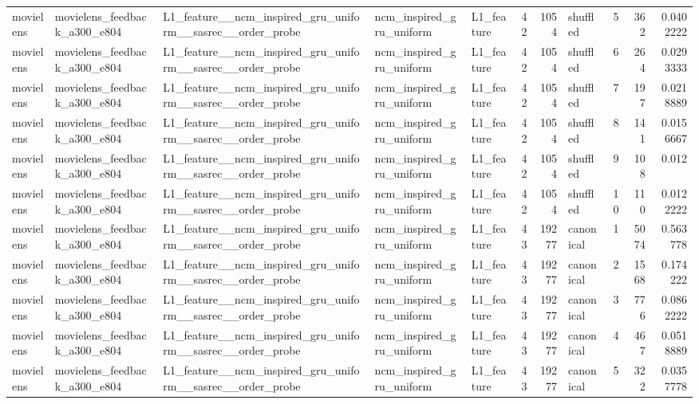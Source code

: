 \begin{table}[htbp!]
\begin{tabular}{lllllrrlrrr}
movielens & movielens\_feedback\_a300\_e804 & L1\_feature\_\_ncm\_inspired\_gru\_uniform\_\_sasrec\_\_order\_probe & ncm\_inspired\_gru\_uniform & L1\_feature & 42 & 1054 & shuffled & 5 & 362 & 0.0402222 \\
movielens & movielens\_feedback\_a300\_e804 & L1\_feature\_\_ncm\_inspired\_gru\_uniform\_\_sasrec\_\_order\_probe & ncm\_inspired\_gru\_uniform & L1\_feature & 42 & 1054 & shuffled & 6 & 264 & 0.0293333 \\
movielens & movielens\_feedback\_a300\_e804 & L1\_feature\_\_ncm\_inspired\_gru\_uniform\_\_sasrec\_\_order\_probe & ncm\_inspired\_gru\_uniform & L1\_feature & 42 & 1054 & shuffled & 7 & 197 & 0.0218889 \\
movielens & movielens\_feedback\_a300\_e804 & L1\_feature\_\_ncm\_inspired\_gru\_uniform\_\_sasrec\_\_order\_probe & ncm\_inspired\_gru\_uniform & L1\_feature & 42 & 1054 & shuffled & 8 & 141 & 0.0156667 \\
movielens & movielens\_feedback\_a300\_e804 & L1\_feature\_\_ncm\_inspired\_gru\_uniform\_\_sasrec\_\_order\_probe & ncm\_inspired\_gru\_uniform & L1\_feature & 42 & 1054 & shuffled & 9 & 108 & 0.012 \\
movielens & movielens\_feedback\_a300\_e804 & L1\_feature\_\_ncm\_inspired\_gru\_uniform\_\_sasrec\_\_order\_probe & ncm\_inspired\_gru\_uniform & L1\_feature & 42 & 1054 & shuffled & 10 & 110 & 0.0122222 \\
movielens & movielens\_feedback\_a300\_e804 & L1\_feature\_\_ncm\_inspired\_gru\_uniform\_\_sasrec\_\_order\_probe & ncm\_inspired\_gru\_uniform & L1\_feature & 43 & 19277 & canonical & 1 & 5074 & 0.563778 \\
movielens & movielens\_feedback\_a300\_e804 & L1\_feature\_\_ncm\_inspired\_gru\_uniform\_\_sasrec\_\_order\_probe & ncm\_inspired\_gru\_uniform & L1\_feature & 43 & 19277 & canonical & 2 & 1568 & 0.174222 \\
movielens & movielens\_feedback\_a300\_e804 & L1\_feature\_\_ncm\_inspired\_gru\_uniform\_\_sasrec\_\_order\_probe & ncm\_inspired\_gru\_uniform & L1\_feature & 43 & 19277 & canonical & 3 & 776 & 0.0862222 \\
movielens & movielens\_feedback\_a300\_e804 & L1\_feature\_\_ncm\_inspired\_gru\_uniform\_\_sasrec\_\_order\_probe & ncm\_inspired\_gru\_uniform & L1\_feature & 43 & 19277 & canonical & 4 & 467 & 0.0518889 \\
movielens & movielens\_feedback\_a300\_e804 & L1\_feature\_\_ncm\_inspired\_gru\_uniform\_\_sasrec\_\_order\_probe & ncm\_inspired\_gru\_uniform & L1\_feature & 43 & 19277 & canonical & 5 & 322 & 0.0357778 \\

\end{tabular}
\end{table}
